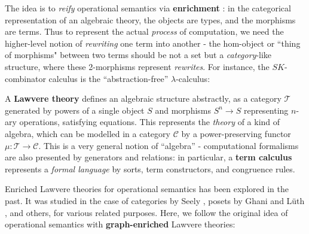 \documentclass[a4paper,UKenglish]{article}
\theoremstyle{definition}
\newcommand{\C}{\mathscr{C}}
\newcommand{\T}{\mathscr{T}}
\begin{document}
The idea is to \textit{reify} operational semantics via \textbf{enrichment} \cite{enrich}: in the categorical representation of an algebraic theory, the objects are types, and the morphisms are terms. Thus to represent the actual \textit{process} of computation, we need the higher-level notion of \textit{rewriting} one term into another - the hom-object or ``thing of morphisms" between two terms should be not a set but a \textit{category}-like structure, where these 2-morphisms represent \textit{rewrites}. For instance, the $SK$-combinator calculus is the ``abstraction-free'' $\lambda$-calculus:

\begin{center}
	\begin{minipage}{.2 \textwidth}
	\end{minipage}\qquad \qquad
	\begin{minipage}{.2 \textwidth}
	\end{minipage}
\end{center}

A \textbf{Lawvere theory} \cite{lawvere} defines an algebraic structure abstractly, as a category $\T$ generated by powers of a single object $S$ and morphisms $S^n \to S$ representing $n$-ary operations, satisfying equations. This represents the \textit{theory} of a kind of algebra, which can be modelled in a category $\C$ by a power-preserving functor $\mu:\T \to \C$. This is a very general notion of ``algebra'' - computational formalisms are also presented by generators and relations: in particular, a \textbf{term calculus} represents a \textit{formal language} by sorts, term constructors, and congruence rules.

Enriched Lawvere theories for operational semantics has been explored in the past. It was studied in the case of categories by Seely \cite{seely}, posets by Ghani and L\"uth \cite{ghani}, and others, for various related purposes. Here, we follow the original idea of operational semantics with \textbf{graph-enriched} Lawvere theories:
\end{document}

